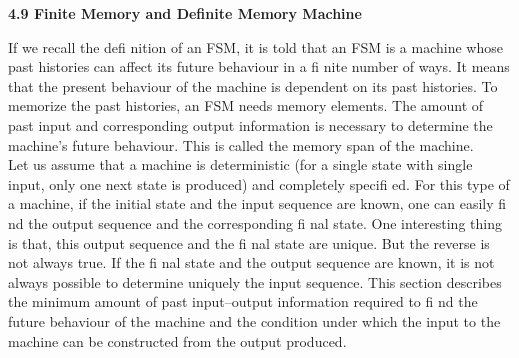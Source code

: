 \documentclass[9pt]{beamer}
\begin{document}
\begin{frame}
\large{
\textbf{4.9 Finite Memory and Definite Memory Machine} \\
}

\vspace*{0.1cm}
\small{
If we recall the defi nition of an FSM, it is told that an FSM is a machine whose past histories can affect
its future behaviour in a fi nite number of ways. It means that the present behaviour of the machine is
dependent on its past histories. To memorize the past histories, an FSM needs memory elements. The
amount of past input and corresponding output information is necessary to determine the machine’s
future behaviour. This is called the memory span of the machine.\\
\hspace*{0.5cm} Let us assume that a machine is deterministic (for a single state with single input, only one next
state is produced) and completely specifi ed. For this type of a machine, if the initial state and the
input sequence are known, one can easily fi nd the output sequence and the corresponding fi nal state.
One interesting thing is that, this output sequence and the fi nal state are unique. But the reverse is not
always true. If the fi nal state and the output sequence are known, it is not always possible to determine
uniquely the input sequence. This section describes the minimum amount of past input–output information
required to fi nd the future behaviour of the machine and the condition under which the input to the
machine can be constructed from the output produced.\\
}

\vspace*{0.4cm}
\end{frame}
\end{document}
